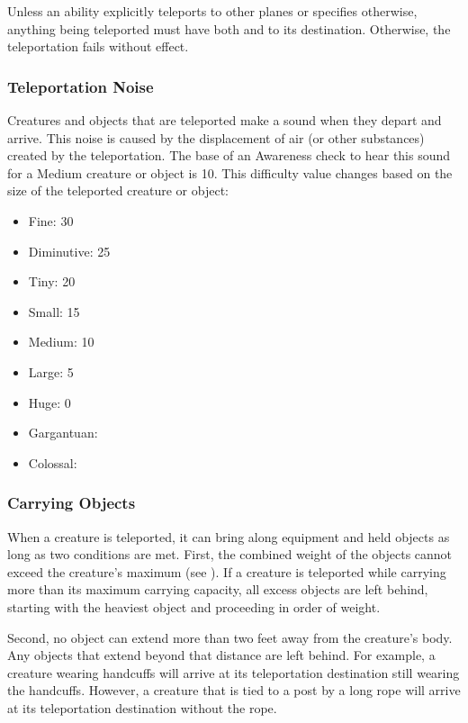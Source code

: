         Unless an ability explicitly teleports to other planes or specifies otherwise, anything being teleported must have both  and  to its destination.
        Otherwise, the teleportation fails without effect.

        \subsubsection{Teleportation Noise}\label{Teleportation Noise}
            Creatures and objects that are teleported make a sound when they depart and arrive.
            This noise is caused by the displacement of air (or other substances) created by the teleportation.
            The base  of an Awareness check to hear this sound for a Medium creature or object is 10.
            This difficulty value changes based on the size of the teleported creature or object:

            \begin{itemize}
                \item Fine: 30
                \item Diminutive: 25
                \item Tiny: 20
                \item Small: 15
                \item Medium: 10
                \item Large: 5
                \item Huge: 0
                \item Gargantuan: 
                \item Colossal: 
            \end{itemize}

        \subsubsection{Carrying Objects}
            When a creature is teleported, it can bring along equipment and held objects as long as two conditions are met.
            First, the combined weight of the objects cannot exceed the creature's maximum  (see ).
            If a creature is teleported while carrying more than its maximum carrying capacity, all excess objects are left behind, starting with the heaviest object and proceeding in order of weight.

            Second, no object can extend more than two feet away from the creature's body.
            Any objects that extend beyond that distance are left behind.
            For example, a creature wearing handcuffs will arrive at its teleportation destination still wearing the handcuffs.
            However, a creature that is tied to a post by a long rope will arrive at its teleportation destination without the rope.


